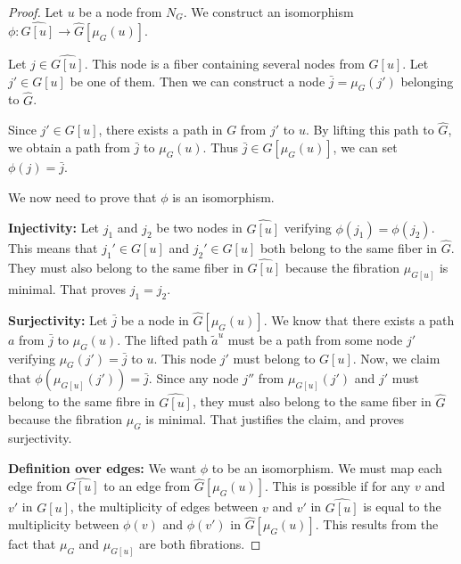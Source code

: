 \documentclass[11pt,letterpaper]{article}
\begin{document}
\begin{proof}
	Let $u$ be a node from $N_G$.
	We construct an isomorphism $\phi : \widehat{G[u]} \rightarrow \hat G[\mu_G(u)]$.

	Let $j \in \widehat{G[u]}$.
	This node is a fiber containing several nodes from $G[u]$.
	Let $j' \in G[u]$ be one of them.
	Then we can construct a node $\bar j = \mu_G(j')$ belonging to $\hat G$.

	Since $j' \in G[u]$, there exists a path in $G$ from $j'$ to $u$.
	By lifting this path to $\hat G$, we obtain a path from $\bar j$ to $\mu_G(u)$.
	Thus $\bar j \in \hat G[\mu_G(u)]$, we can set $\phi(j) = \bar j$.

	We now need to prove that $\phi$ is an isomorphism.

	\noindent \textbf{Injectivity: } Let $j_1$ and $j_2$ be two nodes in $\widehat{G[u]}$ verifying $\phi(j_1) = \phi(j_2)$.
	This means that $j_1' \in G[u]$ and $j_2' \in G[u]$ both belong to the same fiber in $\hat G$.
	They must also belong to the same fiber in $\widehat{G[u]}$ because the fibration $\mu_{G[u]}$ is minimal.
	That proves $j_1 = j_2$.

	\noindent \textbf{Surjectivity: } Let $\bar j$ be a node in $\hat G[\mu_G(u)]$.
	We know that there exists a path $a$ from $\bar j$ to $\mu_G(u)$.
	The lifted path $\tilde{a}^u$ must be a path from some node $j'$ verifying $\mu_G(j') = \bar j$ to $u$.
	This node $j'$ must belong to $G[u]$.
	Now, we claim that $\phi(\mu_{G[u]}(j')) = \bar j$.
	Since any node $j''$ from $\mu_{G[u]}(j')$ and $j'$ must belong to the same fibre in $\widehat{G[u]}$, 
	they must also belong to the same fiber in $\hat G$ because the fibration $\mu_G$ is minimal.
	That justifies the claim, and proves surjectivity.

	\noindent \textbf{Definition over edges:} We want $\phi$ to be an isomorphism. We must map each edge from $\widehat{G[u]}$ to an edge from $\hat G[\mu_G(u)]$.
	This is possible if for any $v$ and $v'$ in $G[u]$, the multiplicity of edges between $v$ and $v'$ in $\widehat{G[u]}$
	is equal to the multiplicity between $\phi(v)$ and $\phi(v')$ in $\hat G[\mu_G(u)]$.
	This results from the fact that $\mu_G$ and $\mu_{G[u]}$ are both fibrations.

\end{proof}
\end{document}
